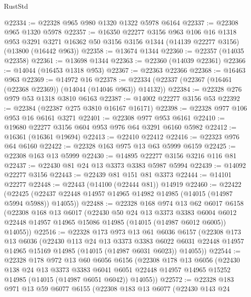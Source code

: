 \begin{lexlean}{RustStd}
\begin{coremodule}
@22334 := @22328 @965 @980 @1320 @1322 @5978 @6164
@22337 := @22308 @965 @1320 @5978
@22357 := @16350
    @22277
    @3156
    @963
    @106
    @16
    @1318
    @953
    @3291
    @3271
    @16362
    @50
    @3156
    @3156
    @1344
    (@14139 @22277 @3156)
    (@13800 (@16442 @963))
@22358 := @13674 @1344
@22360 := @22357 (@14035 @22358)
@22361 := @13698 @1344
@22363 := @22360 (@14039 @22361)
@22366 := @14044 (@16453 @1318 @953)
@22367 := @22363 @22366
@22368 := @16463 @963
@22369 := @14972 @16
@22378 := @22334 (@22337 (@22367 (@16461 (@22368 @22369)) (@14044 (@14046 @963)) @14132))
@22384 := @22328 @276 @979 @53 @1318 @3810 @6163
@22387 := @14002 @22277 @3156 @53
@22392 := @22384 (@22387 @275 @3810 @16167 @16171)
@22398 := @22328 @977 @106 @953 @16 @6161 @3271
@22401 := @22308 @977 @953 @6161
@22410 := @19680 @22277 @3156 @604 @953 @976 @64 @3291 @6160 @5982
@22412 := @16361 (@16361 @19694)
@22413 := @22410 @22412
@22416 := @22323 @976 @64 @6160
@22422 := @22328 @163 @975 @13 @63 @5999 @6159
@22425 := @22308 @163 @13 @5999
@22430 := @14895 @22277 @3156 @3216 @116 @81
@22437 := @22430 @81 @24 @13 @3373 @3383 @5987 @5994
@22439 := @14092 @22277 @3156
@22443 := @22439 @81 @151 @81 @3373
@22444 := @14101 @22277
@22448 := @22443 (@14100 (@22444 @81)) @14919
@22460 := @22422
    (@22425 (@22437 @22448 @14957 @14965 @14982 @14985 (@14015 (@14987 @5994 @5988)) @14055))
@22488 := @22328
    @168
    @974
    @13
    @62
    @6017
    @6158
    (@22308
      @168
      @13
      @6017
      (@22430
        @50
        @24
        @13
        @3373
        @3383
        @6004
        @6012
        @22448
        @14957
        @14965
        @15086
        @14985
        (@14015 (@14987 @6012 @6005))
        @14055))
@22516 := @22328
    @173
    @973
    @13
    @61
    @6036
    @6157
    (@22308
      @173
      @13
      @6036
      (@22430
        @113
        @24
        @13
        @3373
        @3383
        @6022
        @6031
        @22448
        @14957
        @14965
        @15169
        @14985
        (@14015 (@14987 @6031 @6023))
        @14055))
@22544 := @22328
    @178
    @972
    @13
    @60
    @6056
    @6156
    (@22308
      @178
      @13
      @6056
      (@22430
        @138
        @24
        @13
        @3373
        @3383
        @6041
        @6051
        @22448
        @14957
        @14965
        @15252
        @14985
        (@14015 (@14987 @6051 @6042))
        @14055))
@22572 := @22328
    @183
    @971
    @13
    @59
    @6077
    @6155
    (@22308
      @183
      @13
      @6077
      (@22430
        @143
        @24

\end{coremodule}
\end{lexlean}
